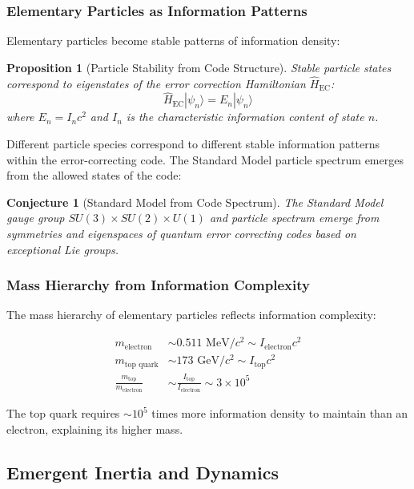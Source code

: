 \documentclass[12pt,a4paper]{article}
\newtheorem{proposition}[theorem]{Proposition}
\newtheorem{conjecture}[theorem]{Conjecture}
\theoremstyle{remark}
\begin{document}
\subsubsection{Elementary Particles as Information Patterns}

Elementary particles become stable patterns of information density:

\begin{proposition}[Particle Stability from Code Structure]
Stable particle states correspond to eigenstates of the error correction Hamiltonian $\hat{H}_{\text{EC}}$:
\begin{equation}
\hat{H}_{\text{EC}}|\psi_n\rangle = E_n|\psi_n\rangle
\end{equation}
where $E_n = I_n c^2$ and $I_n$ is the characteristic information content of state $n$.
\end{proposition}

Different particle species correspond to different stable information patterns within the error-correcting code. The Standard Model particle spectrum emerges from the allowed states of the code:

\begin{conjecture}[Standard Model from Code Spectrum]
The Standard Model gauge group $SU(3) \times SU(2) \times U(1)$ and particle spectrum emerge from symmetries and eigenspaces of quantum error correcting codes based on exceptional Lie groups.
\end{conjecture}

\subsubsection{Mass Hierarchy from Information Complexity}

The mass hierarchy of elementary particles reflects information complexity:

\begin{align}
m_{\text{electron}} &\sim 0.511 \text{ MeV}/c^2 \sim I_{\text{electron}} c^2 \\
m_{\text{top quark}} &\sim 173 \text{ GeV}/c^2 \sim I_{\text{top}} c^2 \\
\frac{m_{\text{top}}}{m_{\text{electron}}} &\sim \frac{I_{\text{top}}}{I_{\text{electron}}} \sim 3 \times 10^5
\end{align}

The top quark requires $\sim 10^5$ times more information density to maintain than an electron, explaining its higher mass.

\subsection{Emergent Inertia and Dynamics}
\label{sec:inertia}
\end{document}
